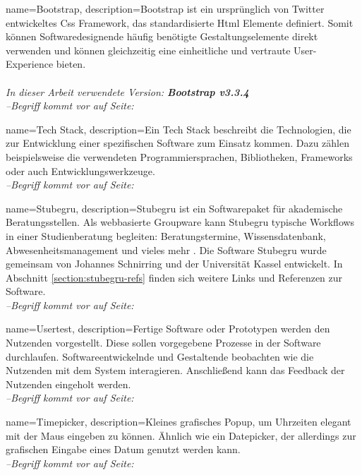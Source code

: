 \makeglossaries

{
    name=Bootstrap,
    description={Bootstrap ist ein ursprünglich von Twitter entwickeltes \gls{Css} Framework, das standardisierte \gls{Html} Elemente definiert. Somit können Softwaredesignende häufig benötigte Gestaltungselemente direkt verwenden und können gleichzeitig eine einheitliche und vertraute User-Experience bieten.\\ \\
            \textit{In dieser Arbeit verwendete Version: \textbf{Bootstrap v3.3.4}}
            \cite{Bootstrap}}
    \\\textit{--Begriff kommt vor auf Seite: }
}

{
    name=Tech Stack,
    description={Ein Tech Stack beschreibt die Technologien, die zur Entwicklung einer spezifischen Software zum Einsatz kommen. Dazu zählen beispielsweise die verwendeten Programmiersprachen, Bibliotheken, Frameworks oder auch Entwicklungswerkzeuge.}
    \\\textit{--Begriff kommt vor auf Seite: }
}

{
    name=Stubegru,
    description={Stubegru ist ein Softwarepaket für akademische Beratungsstellen. Als webbasierte Groupware kann Stubegru typische Workflows in einer Studienberatung begleiten: Beratungstermine, Wissensdatenbank, Abwesenheitsmanagement und vieles mehr
            \cite{stubegruWebsite}. Die Software Stubegru wurde gemeinsam von Johannes Schnirring und der Universität Kassel entwickelt. In Abschnitt \ref{section:stubegru-refs} finden sich weitere Links und Referenzen zur Software.}
    \\\textit{--Begriff kommt vor auf Seite: }
}

{
    name=Usertest,
    description={Fertige Software oder Prototypen werden den Nutzenden vorgestellt. Diese sollen vorgegebene Prozesse in der Software durchlaufen. Softwareentwickelnde und Gestaltende beobachten wie die Nutzenden mit dem System interagieren. Anschließend kann das Feedback der Nutzenden eingeholt werden.}
    \\\textit{--Begriff kommt vor auf Seite: }
}

{
    name=Timepicker,
    description={Kleines grafisches Popup, um Uhrzeiten elegant mit der Maus eingeben zu können. Ähnlich wie ein Datepicker, der allerdings zur grafischen Eingabe eines Datum genutzt werden kann.
            \cite{datepicker}}
    \\\textit{--Begriff kommt vor auf Seite: }
}

